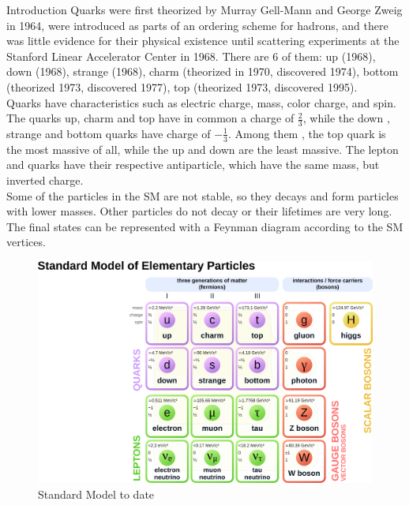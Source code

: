 \begin{chapter}{Introduction}
Quarks were first theorized by Murray Gell-Mann and 
George Zweig in 1964, were introduced as parts of an ordering scheme for hadrons, and there was little evidence for their physical existence until scattering experiments at the Stanford Linear Accelerator Center in 1968\cite{griff}.
There are 6 of them: up (1968), down (1968), strange (1968), charm (theorized in 1970, discovered 1974), bottom (theorized 1973, discovered 1977), top (theorized 1973, discovered 1995).
\\

Quarks have characteristics such as  electric charge, mass, color charge, and spin. The quarks up, charm and top have in common a charge of $\frac{2}{3}$, while the down , strange and bottom quarks have charge of $-\frac{1}{3}$. Among them , the top quark is the most massive of all, while the up and down are the least massive. 
The lepton and quarks have their respective antiparticle, which have the same mass, but inverted charge.\\  
Some of the particles in the SM are not stable, so they decays and form particles with lower masses. Other particles do not decay or their lifetimes are very long. The final states can be represented with a Feynman diagram according to the SM vertices\cite{mark}.

\begin{center}
    \begin{figure}[!htbp]
        \centering
        \includegraphics[scale=0.3]{Chapter1/sm1.png}
        \caption{Standard Model to date\protect \footnotemark }
        \label{sm1}
    \end{figure}
\end{center}


\end{chapter}
